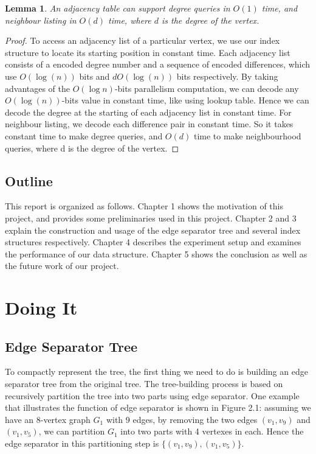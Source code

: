 \documentclass[12pt,glossary]{dalthesis}
\newtheorem{lemma}[theorem]{Lemma}
\begin{document}
\begin{lemma}
An adjacency table can support degree queries in $O(1)$ time, and neighbour
listing in $O(d)$ time, where $d$ is the degree of the vertex.
\end{lemma}
 
\begin{proof}
To access an adjacency list of a particular vertex, we use our index structure to locate its starting position in constant time. Each adjacency list consists of a encoded degree number and a sequence of encoded differences, which use $O(\log (n))$ bits and $dO(\log (n))$ bits respectively. By taking advantages of the $O(\log n)$-bits parallelism computation, we can decode any $O(\log (n))$-bits value in constant time, like using lookup table. Hence we can decode the degree at the starting of each adjacency list in constant time. For neighbour listing, we decode each difference pair in constant time. So it takes constant time to make degree queries, and $O(d)$ time to make neighbourhood queries, where d is the degree of the vertex.
\end{proof}

\section{Outline}
This report is organized as follows. Chapter 1 shows the motivation of this project, and provides some preliminaries used in this project. Chapter 2 and 3 explain the construction and usage of the edge separator tree and several index structures respectively. Chapter 4 describes the experiment setup and examines the performance of our data structure. Chapter 5 shows the conclusion as well as the future work of our project.

\chapter{Doing It}

\section{Edge Separator Tree}


To compactly represent the tree, the first thing we need to do is building an edge separator tree from the original tree. The tree-building process is based on recursively partition the tree into two parts using edge separator. One example that illustrates the function of edge separator is shown in Figure 2.1: assuming we have an 8-vertex graph $G_{1}$ with 9 edges, by removing the two edges $(v_{1}, v_{9})$ and $(v_{1}, v_{5})$, we can partition $G_{1}$ into two parts with 4 vertexes in each. Hence the edge separator in this partitioning step is $\{(v_{1}, v_{9}),(v_{1}, v_{5}) \}$.
\end{document}
